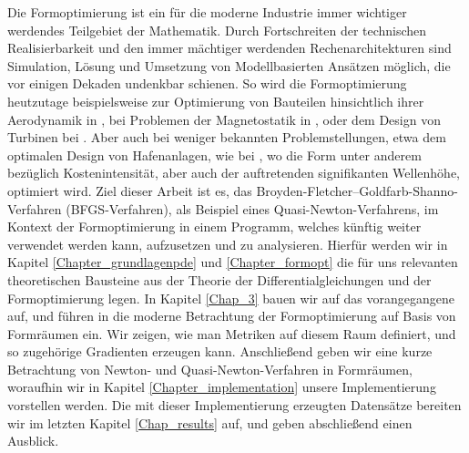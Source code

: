 \documentclass[bibliography=totoc,12pt,a4paper]{scrartcl}
\theoremstyle{exampstyle}
\numberwithin{equation}{section}
\renewenvironment{abstract}
 {\small
  \begin{center}
  \bfseries \abstractname\vspace{-.5em}\vspace{0pt}
  \end{center}
  \list{}{%
    \setlength{\leftmargin}{10mm}%
    \setlength{\rightmargin}{\leftmargin}%
  }%
  \item\relax}
 {\endlist}
\begin{document}
\begin{abstract}
Die Formoptimierung ist ein für die moderne Industrie immer wichtiger werdendes Teilgebiet der Mathematik. Durch Fortschreiten der technischen Realisierbarkeit und den immer mächtiger werdenden Rechenarchitekturen sind Simulation, Lösung und Umsetzung von Modellbasierten Ansätzen möglich, die vor einigen Dekaden undenkbar schienen. So wird die Formoptimierung heutzutage beispielsweise zur Optimierung von Bauteilen hinsichtlich ihrer Aerodynamik in \cite{abstract1}, bei Problemen der Magnetostatik in \cite{abstract2}, oder dem Design von Turbinen bei \cite{abstract4}. Aber auch bei weniger bekannten Problemstellungen, etwa dem optimalen Design von Hafenanlagen, wie bei \cite{abstract3}, wo die Form unter anderem bezüglich Kostenintensität, aber auch der auftretenden signifikanten Wellenhöhe, optimiert wird. Ziel dieser Arbeit ist es, das Broyden-Fletcher–Goldfarb-Shanno-Verfahren (BFGS-Verfahren), als Beispiel eines Quasi-Newton-Verfahrens, im Kontext der Formoptimierung in einem Programm, welches künftig weiter verwendet werden kann, aufzusetzen und zu analysieren. Hierfür werden wir in 
Kapitel \ref{Chapter_grundlagenpde} und \ref{Chapter_formopt} die für uns relevanten theoretischen Bausteine aus der Theorie der Differentialgleichungen und der Formoptimierung legen. In Kapitel \ref{Chap_3} bauen wir auf das vorangegangene auf, und führen in die moderne Betrachtung der Formoptimierung auf Basis von Formräumen ein. Wir zeigen, wie man Metriken auf diesem Raum definiert, und so zugehörige Gradienten erzeugen kann. Anschließend geben wir eine kurze Betrachtung von Newton- und Quasi-Newton-Verfahren in Formräumen, woraufhin wir in Kapitel \ref{Chapter_implementation} unsere Implementierung vorstellen werden. Die mit dieser Implementierung erzeugten Datensätze bereiten wir im letzten Kapitel \ref{Chap_results} auf, und geben abschließend einen Ausblick.
\end{abstract}
\vspace{1cm}









\newpage
\nocite{*}


\end{document}
